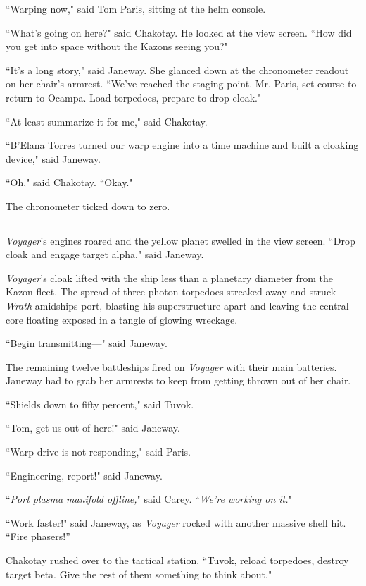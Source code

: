 \documentclass[twoside,letterpaper,12pt]{memoir}
\begin{document}
``Warping now," said Tom Paris, sitting at the helm console. 

``What's going on here?" said Chakotay. He looked at the view screen. ``How did you get into space without the Kazons seeing you?" 

``It's a long story," said Janeway. She glanced down at the chronometer readout on her chair's armrest. ``We've reached the staging point. Mr. Paris, set course to return to Ocampa. Load torpedoes, prepare to drop cloak." 

``At least summarize it for me," said Chakotay. 

``B'Elana Torres turned our warp engine into a time machine and built a cloaking device," said Janeway. 

``Oh," said Chakotay. ``Okay."

The chronometer ticked down to zero. 

\begin{center}\rule{3cm}{0.4 pt}\end{center} 

\textit{Voyager}'s engines roared and the yellow planet swelled in the view screen. ``Drop cloak and engage target alpha," said Janeway. 

\textit{Voyager}'s cloak lifted with the ship less than a planetary diameter from the Kazon fleet. The spread of three photon torpedoes streaked away and struck \textit{Wrath }amidships port, blasting his superstructure apart and leaving the central core floating exposed in a tangle of glowing wreckage. 

``Begin transmitting---" said Janeway. 

The remaining twelve battleships fired on \textit{Voyager} with their main batteries. Janeway had to grab her armrests to keep from getting thrown out of her chair. 

``Shields down to fifty percent," said Tuvok. 

``Tom, get us out of here!" said Janeway. 

``Warp drive is not responding," said Paris. 

``Engineering, report!" said Janeway. 

``\textit{Port plasma manifold offline,}" said Carey. ``\textit{We're working on it.}" 

``Work faster!" said Janeway, as \textit{Voyager} rocked with another massive shell hit. “Fire phasers!” 

Chakotay rushed over to the tactical station. ``Tuvok, reload torpedoes, destroy target beta. Give the rest of them something to think about." 
\end{document}
